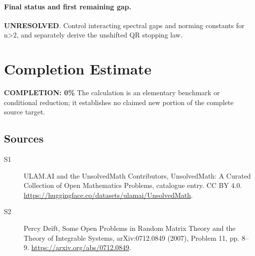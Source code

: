 \documentclass[11pt]{article}
\begin{document}
\paragraph{Final status and first remaining gap.}
\textbf{UNRESOLVED}. Control interacting spectral gaps and norming constants for n>2, and separately derive the unshifted QR stopping law.

\section{Completion Estimate}
\noindent\textbf{COMPLETION: 0\%}
The calculation is an elementary benchmark or conditional reduction; it establishes no claimed new portion of the complete source target.

\subsection{Sources}
\begin{description}
\item[\hypertarget{source:statement:1}{S1}] ULAM.AI and the UnsolvedMath Contributors, UnsolvedMath: A Curated Collection of Open Mathematics Problems, catalogue entry. CC BY 4.0. \url{https://huggingface.co/datasets/ulamai/UnsolvedMath}.
\item[\hypertarget{source:statement:2}{S2}] Percy Deift, Some Open Problems in Random Matrix Theory and the Theory of Integrable Systems, arXiv:0712.0849 (2007), Problem 11, pp. 8--9. \url{https://arxiv.org/abs/0712.0849}.
\end{description}
\label{end:statement}
\end{document}

